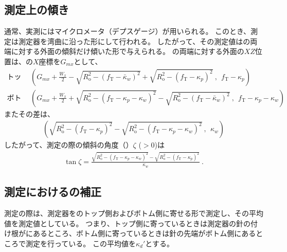 \subsection{測定上の傾き}
通常、実測にはマイクロメータ（デプスゲージ）が用いられる。
このとき、測定は測定器を湾曲に沿った形にして行われる。
したがって、その測定値は\KeywayWidth の両端に対する外面の傾斜だけ傾いた形で与えられる。
\KeywayWidth の両端に対する外面の$XZ$位置は、\KeywayCenter の$X$座標を$G_{mx}$として、
\begin{align*}
  \text{トップ側：}&~~
  \left(
  G_{mx}+\frac{W_x}2
  -\sqrt{R_\mathrm o^2-(f_\mathrm T-\bar\kappa_w)^2}
  +\sqrt{R_\mathrm o^2-(f_\mathrm T-\kappa_p)^2}~,~~
  f_\mathrm T-\kappa_p
  \right)\\
  \text{ボトム側：}&~~
  \left(
  G_{mx}+\frac{W_x}2
  +\sqrt{R_\mathrm o^2-(f_\mathrm T-\kappa_p-\kappa_w)^2}
  -\sqrt{R_\mathrm o^2-(f_\mathrm T-\bar\kappa_w)^2}~,~~
  f_\mathrm T-\kappa_p-\kappa_w
  \right)
\end{align*}
またその差は、
\begin{align*}
  \left(
  \sqrt{R_\mathrm o^2-(f_\mathrm T-\kappa_p)^2}
  -\sqrt{R_\mathrm o^2-(f_\mathrm T-\kappa_p-\kappa_w)^2}~,~~
  \kappa_w
  \right)
\end{align*}
したがって、測定の際の傾斜の角度（\KeywayDepthMeasurementAngle）$\zeta$ ($> 0$)は
\begin{align}
  \label{eq:angleZeta}
  \tan\zeta
  = \frac{\sqrt{R_\mathrm o^2-\left(f_\mathrm T-\kappa_p-\kappa_w\right)^2}
          -\sqrt{R_\mathrm o^2-\left(f_\mathrm T-\kappa_p\right)^2}}
         {\kappa_w}\ .
\end{align}


\clearpage
\subsection{測定における\KeywayDepth の補正}%
測定の際は、測定器を\Keyway のトップ側およびボトム側に寄せる形で測定し、その平均値を測定値としている。
つまり、トップ側に寄っているときは測定器の針の付け根が\KeywayPos にあるところ、ボトム側に寄っているときは針の先端が\KeywayWidth ボトム側にあるところで測定を行っている。
この平均値を$\kappa_d'$とする。

